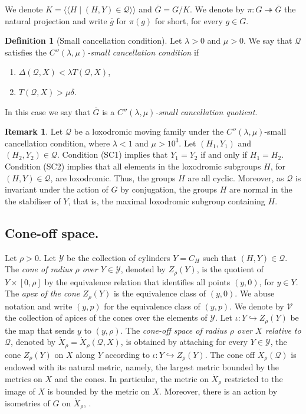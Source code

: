 \documentclass[leqno,a4paper,10pt]{amsart}
\theoremstyle{plain}
\theoremstyle{definition}
\newtheorem{df}[thm]{Definition}
\newtheorem{rem}[thm]{Remark}
\theoremstyle{remark}
\newcommand{\q}[1]{\overline{#1}}
\newcommand{\scrQ}{\mathscr{Q}}
\newcommand{\scrY}{\mathscr{Y}}
\newcommand{\scrV}{\mathscr{V}}
\newcommand{\lnormal}{%
	\langle\!\langle%
}
\newcommand{\rnormal}{%
	\rangle\!\rangle%
}
\newcommand{\normal}[1]{%
	\lnormal #1 \rnormal
}
\newcommand{\onto}{\twoheadrightarrow}
\newcommand{\into}{\hookrightarrow}
\begin{document}
 We denote $K=\normal{H\mid (H,Y)\in \scrQ}$ and $\q G= G/K$. We denote by $\pi\colon G \onto \q G$ the natural projection and write $\q g$ for $\pi(g)$ for short, for every $g\in G$. 
\begin{df}[Small cancellation condition]\label{D:small-cancellation}
	Let $\lambda>0$ and $\mu>0$. We say that $\scrQ$ satisfies the \emph{$C''(\lambda,\mu)$-small cancellation condition} if 
	\begin{enumerate}[label=(SC\arabic*)]	
		\item $\Delta(\scrQ,X)< \lambda T(\scrQ,X)$,
		\item $T(\scrQ,X)> \mu\delta$.
	\end{enumerate}
In this case we say that $\q G$ is a \emph{$C''(\lambda,\mu)$-small cancellation quotient}.
\end{df}


\begin{rem} Let $\scrQ$ be a loxodromic moving family under the $C''(\lambda,\mu)$-small cancellation condition, where $\lambda <1$ and $\mu>10^3$. Let $(H_1,Y_1)$ and $(H_2,Y_2)\in \scrQ$. 
Condition (SC1) implies that $Y_1=Y_2$ if and only if $H_1=H_2$. Condition (SC2) implies that all elements in the loxodromic subgroups  $H$, for $(H,Y) \in \scrQ$, are loxodromic. Thus, the groups $H$ are all cyclic.
Moreover, as $\scrQ$ is invariant under the action of $G$ by conjugation, the groups $H$ are normal in the the stabiliser of $Y$, that is, the maximal loxodromic subgroup containing $H$.   
\end{rem}


\subsection{Cone-off space.}\label{S:cone-off}
Let $\rho>0$. Let $\scrY$ be the collection of cylinders $Y=C_H$ such that $(H,Y)\in \scrQ$. The \emph{cone of radius $\rho$ over $Y\in \scrY$}, denoted by $Z_{\rho}(Y)$, is the quotient of $Y\times[0,\rho]$ by the equivalence relation that identifies all points $(y,0)$, for $y\in Y$. The \emph{apex of  the cone $Z_{\rho}(Y)$} is the equivalence class of $(y,0)$. We abuse notation and write $(y,p)$ for the equivalence class of $(y,p)$. We denote by $\scrV$ the collection of apices of the cones over the elements of $\scrY$. Let $\iota\colon Y\into Z_{\rho}(Y)$ be the map that sends $y$ to $(y,\rho)$. The \emph{cone-off space of radius $\rho$ over $X$ relative to $\scrQ$}, denoted by $\dot{X}_{\rho}=\dot{X}_{\rho}(\scrQ,X)$, is obtained by attaching for every $Y\in \scrY$, the cone $Z_{\rho}(Y)$ on $X$ along $Y$ according to $\iota \colon Y\into Z_{\rho}(Y)$. 
The cone off $\dot{X}_{\rho}(\scrQ)$ is endowed with its natural metric, namely, the largest metric bounded by the metrics on $X$ and the cones. In particular, the metric on $\dot X_\rho$ restricted to the image of $X$ is bounded by the metric on $X$. Moreover, there is an action by isometries of $G$ on $\dot{X}_{\rho}$, \cite[Section 5.1]{coulon_geometry_2014}.
\end{document}
